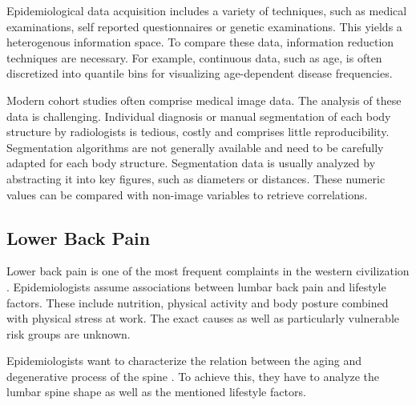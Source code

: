 \documentclass[a4paper,twoside]{style/article}
\begin{document}
Epidemiological data acquisition includes a variety of techniques, such as medical examinations, self reported questionnaires or genetic examinations.
This yields a heterogenous information space.
To compare these data, information reduction techniques are necessary.
For example, continuous data, such as age, is often discretized into quantile bins for visualizing age-dependent disease frequencies.

Modern cohort studies often comprise medical image data.
The analysis of these data is challenging.
Individual diagnosis or manual segmentation of each body structure by radiologists is tedious, costly and comprises little reproducibility.
Segmentation algorithms are not generally available and need to be carefully adapted for each body structure.
Segmentation data is usually analyzed by abstracting it into key figures, such as diameters or distances.
These numeric values can be compared with non-image variables to retrieve correlations.
\subsection{Lower Back Pain}
Lower back pain is one of the most frequent complaints in the western civilization \cite{Hoy2010}.
Epidemiologists assume associations between lumbar back pain and lifestyle factors.
These include nutrition, physical activity and body posture combined with physical stress at work.
The exact causes as well as particularly vulnerable risk groups are unknown.

Epidemiologists want to characterize the relation between the aging and degenerative process of the spine \cite{Szpalski2005}. %
To achieve this, they have to analyze the lumbar spine shape as well as the mentioned lifestyle factors.
\end{document}
